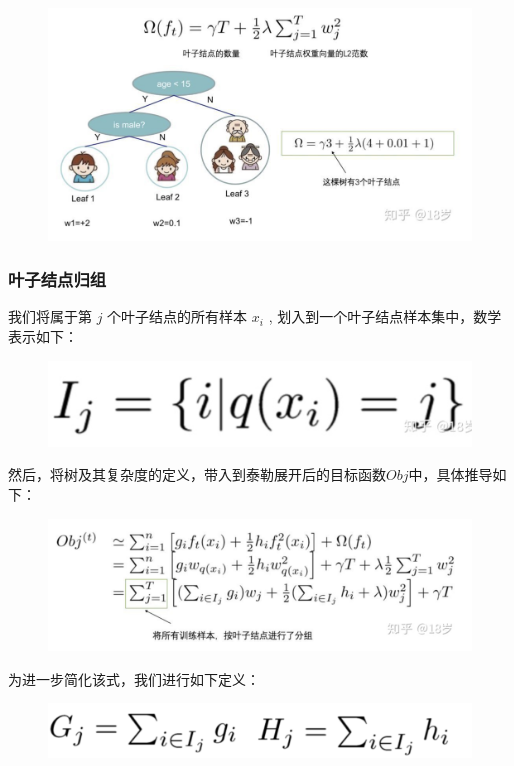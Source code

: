 \documentclass[12pt]{article}
\begin{document}
\begin{figure}[H]
    \centering
    \includegraphics[width=1\textwidth]{fig/XGBoost_Tree_Complexity_Example.png}
\end{figure}

\subsubsection{叶子结点归组}
我们将属于第 $j$ 个叶子结点的所有样本 $x_i$ , 划入到一个叶子结点样本集中，数学表示如下：
\begin{figure}[H]
    \centering
    \includegraphics[width=.3\textwidth]{fig/XGBoost_Tree_Eq_Node_Grouping.png}
\end{figure}

然后，将树及其复杂度的定义，带入到泰勒展开后的目标函数$Obj$中，具体推导如下：
\begin{figure}[H]
    \centering
    \includegraphics[width=.8\textwidth]{fig/XGBoost_Tree_Eq_Node_Grouping_Obj.png}
\end{figure}

为进一步简化该式，我们进行如下定义：
\begin{figure}[H]
    \centering
    \includegraphics[width=.5\textwidth]{fig/XGBoost_Tree_Eq_Node_Grouping_Obj_Simplify.png}
\end{figure}
\end{document}
